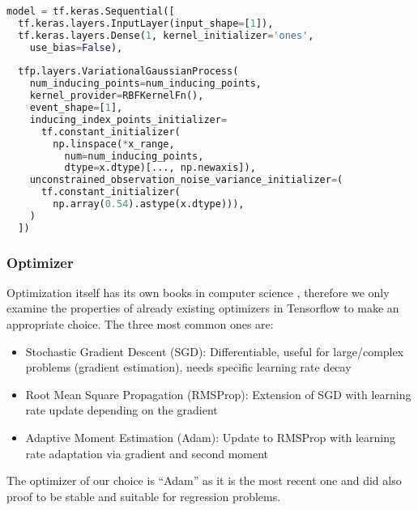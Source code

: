 		\newpage
		\begin{lstlisting}[caption={Distribution Fit}, language=python, label={p:tfp_example_3}]
model = tf.keras.Sequential([
  tf.keras.layers.InputLayer(input_shape=[1]),
  tf.keras.layers.Dense(1, kernel_initializer='ones',
    use_bias=False),
    
  tfp.layers.VariationalGaussianProcess(
    num_inducing_points=num_inducing_points, 
    kernel_provider=RBFKernelFn(), 
    event_shape=[1], 
    inducing_index_points_initializer=
      tf.constant_initializer(
        np.linspace(*x_range,
          num=num_inducing_points,
          dtype=x.dtype)[..., np.newaxis]),
    unconstrained_observation_noise_variance_initializer=(
      tf.constant_initializer(
        np.array(0.54).astype(x.dtype))),
    )
  ])	
		\end{lstlisting}
		
		\subsubsection{Optimizer}
		Optimization itself has its own books in computer science \cite[p. 267f]{deep-learning}, therefore we only examine the properties of already existing optimizers in Tensorflow to make an appropriate choice. The three most common ones are:
		
		\begin{itemize}
		\item Stochastic Gradient Descent (SGD): Differentiable, useful for large/complex problems (gradient estimation), needs specific learning rate decay \cite{bottou-sgd}
		\item Root Mean Square Propagation (RMSProp): Extension of SGD with learning rate update depending on the gradient \cite{rmsprop}
		\item Adaptive Moment Estimation (Adam): Update to RMSProp with learning rate adaptation via gradient and second moment \cite{adam}
		\end{itemize}

		The optimizer of our choice is \enquote{Adam} as it is the most recent one and did also proof to be stable and suitable for regression problems.		
		
